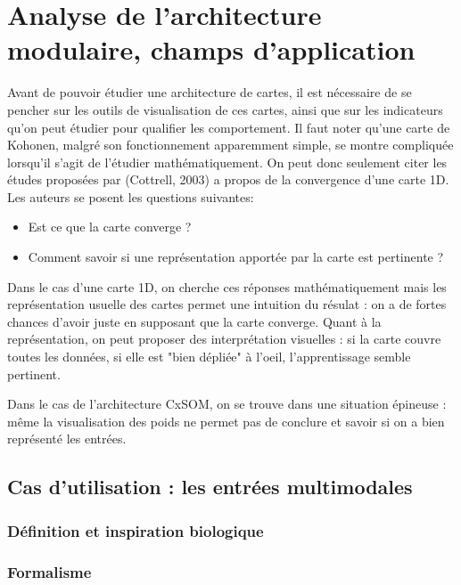 \chapter{Analyse de l'architecture modulaire, champs d'application}

\graphicspath{{03-Algorithme/}}

Avant de pouvoir étudier une architecture de cartes, il est nécessaire de se pencher sur les outils de visualisation de ces cartes, ainsi que sur les indicateurs qu'on peut étudier pour qualifier les comportement. 
Il faut noter qu'une carte de Kohonen, malgré son fonctionnement apparemment simple, se montre compliquée lorsqu'il s'agit de l'étudier mathématiquement. On peut donc seulement citer les études proposées par (Cottrell, 2003) a propos de la convergence d'une carte 1D. Les auteurs se posent les questions suivantes: 
\begin{itemize}
\item Est ce que la carte converge ? 
\item Comment savoir si une représentation apportée par la carte est pertinente ?  
\end{itemize}

Dans le cas d'une carte 1D, on cherche ces réponses mathématiquement mais les représentation usuelle des cartes permet une intuition du résulat : on a de fortes chances d'avoir juste en supposant que la carte converge. Quant à la représentation, on peut proposer des interprétation visuelles : si la carte couvre toutes les données, si elle est "bien dépliée" à l'oeil, l'apprentissage semble pertinent.

Dans le cas de l'architecture CxSOM, on se trouve dans une situation épineuse : même la visualisation des poids ne permet pas de conclure et savoir si on a bien représenté les entrées. 


\section{Cas d'utilisation : les entrées multimodales}

\subsection{Définition et inspiration biologique}



\subsection{Formalisme}




